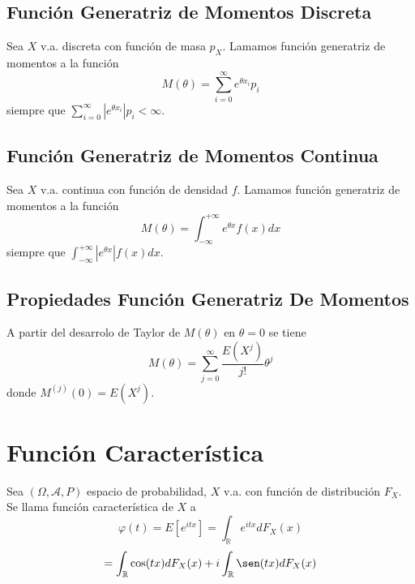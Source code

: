 \subsection{Función Generatriz de Momentos Discreta}

\begin{defn}
  Sea $X$ v.a. discreta con función de masa $p_{X}$. Lamamos función generatriz de momentos a la función
  \[ 
    M(\theta) = \sum_{i = 0}^{\infty} e ^{\theta x_{i}} p_{i} 
  \] 
  siempre que $\sum_{i = 0}^{\infty} |e ^{\theta x_{i}}| p_{i} < \infty$.
\end{defn}

\subsection{Función Generatriz de Momentos Continua}

\begin{defn}
  Sea $X$ v.a. continua con función de densidad $f$. Lamamos función generatriz de momentos a la función
  \[ 
    M(\theta) = \int_{-\infty}^{+\infty} e ^{\theta x} f(x) dx
  \] 
  siempre que $\int_{-\infty}^{+\infty} |e ^{\theta x}| f(x) dx$.
\end{defn}

\subsection{Propiedades Función Generatriz De Momentos}

\begin{prop}
  A partir del desarrolo de Taylor de $M(\theta)$ en $\theta = 0$ se tiene
  \[ 
    M(\theta) = \sum_{j = 0}^{\infty} \frac{E(X^{j})}{j!}\theta^{j} 
  \] 
  donde $M^{(j)}(0) = E(X^{j})$.
\end{prop}

\section{Función Característica}

\begin{defn}
  Sea $(\Omega, \mathcal{A}, P )$ espacio de probabilidad, $X$ v.a. con función de distribución $F_{X}$. Se llama función característica de $X$ a
  \[ 
    \varphi(t) = E [e^{itx}] = \int_{\mathbb{R}}^{} e^{itx} dF_{X}(x)
  \] 
  \[ 
    = \int_{\mathbb{R}}^{} \cos(tx) dF_{X}(x) + i \int_{\mathbb{R}}^{} \sen(tx) dF_{X}(x)
  \] 
\end{defn}


